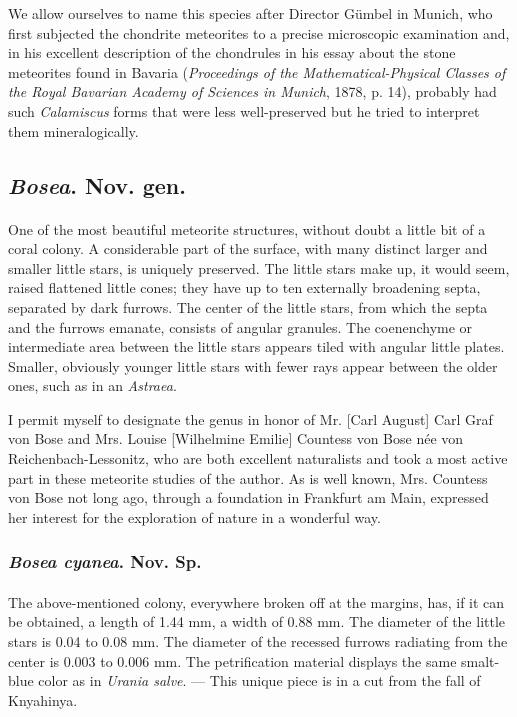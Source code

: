 \documentclass[a4paper, 12pt, oneside]{article}
\begin{document}
We allow ourselves to name this species after Director Gümbel in Munich, who first subjected the chondrite meteorites to a precise microscopic examination and, in his excellent description of the chondrules in his essay about the stone meteorites found in Bavaria (\emph{Proceedings of the Mathematical-Physical Classes of the Royal Bavarian Academy of Sciences in Munich}, 1878, p. 14), probably had such \emph{Calamiscus} forms that were less well-preserved but he tried to interpret them mineralogically.
\subsection{\emph{Bosea}. Nov. gen.}
\paragraph{}
One of the most beautiful meteorite structures, without doubt a little bit of a coral colony. A considerable part of the surface, with many distinct larger and smaller little stars, is uniquely preserved. The little stars make up, it would seem, raised flattened little cones; they have up to ten externally broadening septa, separated by dark furrows. The center of the little stars, from which the septa and the furrows emanate, consists of angular granules. The coenenchyme or intermediate area between the little stars appears tiled with angular little plates. Smaller, obviously younger little stars with fewer rays appear between the older ones, such as in an \emph{Astraea}.

I permit myself to designate the genus in honor of Mr. [Carl August] Carl Graf von Bose and Mrs. Louise [Wilhelmine Emilie] Countess von Bose née von Reichenbach-Lessonitz, who are both excellent naturalists and took a most active part in these meteorite studies of the author. As is well known, Mrs. Countess von Bose not long ago, through a foundation in Frankfurt am Main, expressed her interest for the exploration of nature in a wonderful way.
\subsubsection{\emph{Bosea cyanea}. Nov. Sp.}
\paragraph{}
The above-mentioned colony, everywhere broken off at the margins, has, if it can be obtained, a length of 1.44 mm, a width of 0.88 mm. The diameter of the little stars is 0.04 to 0.08 mm. The diameter of the recessed furrows radiating from the center is 0.003 to 0.006 mm. The petrification material displays the same smalt-blue color as in \emph{Urania salve}. --- This unique piece is in a cut from the fall of Knyahinya.
\clearpage
\end{document}
